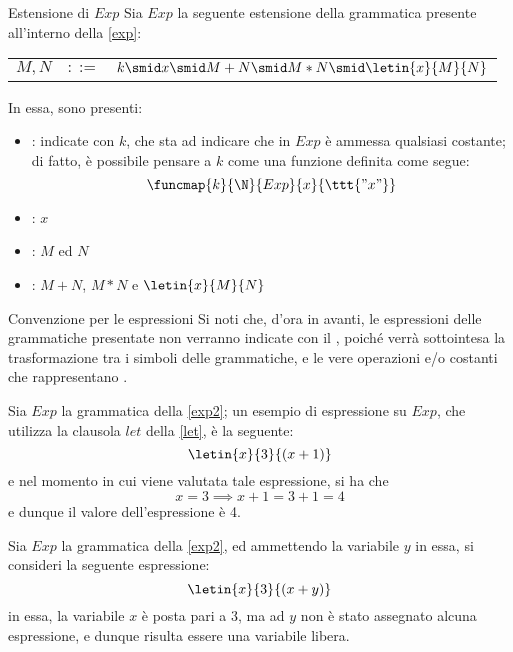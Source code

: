 \documentclass[a4paper, 12pt]{report}
\begin{document}
    \begin{frameddefn}[label={exp2}]{Estensione di $Exp$}
        Sia $Exp$ la seguente estensione della grammatica presente all'interno della \cref{exp}:

        \begin{center}
            \begin{tabular}{rcl}
                $M, N$ & $::=$ & $k \smid x \smid M + N \smid M * N \smid \letin{x}{M}{N}$ \\
            \end{tabular}
        \end{center}

        In essa, sono presenti:

        \begin{itemize}
            \item {}: indicate con $k$, che sta ad indicare che in $Exp$ è ammessa qualsiasi costante; di fatto, è possibile pensare a $k$ come una funzione definita come segue: $$\funcmap{k}{\N}{Exp}{x}{\ttt{"x"}}$$
            \item {}: $x$
            \item {}: $M$ ed $N$
            \item {}: $M + N$, $M * N$ e $\letin{x}{M}{N}$
        \end{itemize}
    \end{frameddefn}

    \begin{framedobs}{Convenzione per le espressioni}
        Si noti che, d'ora in avanti, le espressioni delle grammatiche presentate non verranno indicate con il , poiché verrà sottointesa la trasformazione tra i simboli  delle grammatiche, e le vere operazioni e/o costanti che rappresentano .
    \end{framedobs}

    \begin{example}
        Sia $Exp$ la grammatica della \cref{exp2}; un esempio di espressione su $Exp$, che utilizza la clausola $let$ della \cref{let}, è la seguente: $$\letin{x}{3}{(x + 1)}$$ e nel momento in cui viene valutata tale espressione, si ha che $$x = 3 \implies x + 1 = 3 + 1 = 4$$ e dunque il valore dell'espressione è 4.
    \end{example}

    \begin{example}
        Sia $Exp$ la grammatica della \cref{exp2}, ed ammettendo la variabile $y$ in essa, si consideri la seguente espressione: $$\letin{x}{3}{(x + y)}$$ in essa, la variabile $x$ è posta pari a 3, ma ad $y$ non è stato assegnato alcuna espressione, e dunque risulta essere una variabile libera.
    \end{example}
\end{document}
